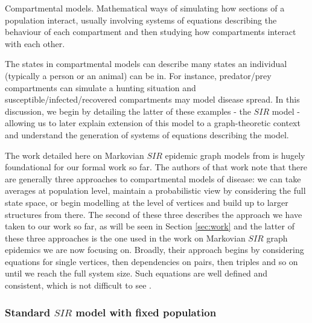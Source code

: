 \documentclass[../report.tex]{subfiles}
\begin{document}
\begin{definition}{Compartmental models.}
Mathematical ways of simulating how sections of a population interact, usually involving systems of equations describing the behaviour of each compartment and then studying how compartments interact with each other. 
\end{definition}
The states in compartmental models can describe many states an individual (typically a person or an animal) can be in. For instance, predator/prey compartments can simulate a hunting situation and susceptible/infected/recovered compartments may model disease spread. In this discussion, we begin by detailing the latter of these examples - the $SIR$ model - allowing us to later explain extension of this model to a graph-theoretic context and understand the generation of systems of equations describing the model. 

The work detailed here on Markovian $SIR$ epidemic graph models from \cite{kiss_2014} is hugely foundational for our formal work so far. The authors of that work note that there are generally three approaches to compartmental models of disease: we can take averages at population level, maintain a probabilistic view by considering the full state space, or begin modelling at the level of vertices and build up to larger structures from there. The second of these three describes the approach we have taken to our work so far, as will be seen in Section \ref{sec:work} and the latter of these three approaches is the one used in the work on Markovian $SIR$ graph epidemics we are now focusing on. Broadly, their approach begins by considering equations for single vertices, then dependencies on pairs, then triples and so on until we reach the full system size. Such equations are well defined and consistent, which is not difficult to see \cite{kiss_2014}.

\subsubsection{Standard $SIR$ model with fixed population}
\end{document}

